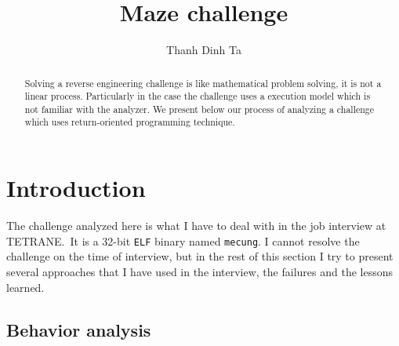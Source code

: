 \documentclass{easychair}
\begin{document}
\title{Maze challenge}

\author{
  Thanh Dinh Ta
}



\clearpage
\maketitle

\begin{abstract}
  Solving a reverse engineering challenge is like mathematical problem solving, it is not a linear process. Particularly in the case the challenge uses a execution model which is not familiar with the analyzer. We present below our process of analyzing a challenge which uses return-oriented programming technique.
\end{abstract}

\section{Introduction}
\label{sec:introduction}

The challenge analyzed here is what I have to deal with in the job interview at TETRANE.~It is a 32-bit \texttt{ELF} binary named \texttt{mecung}. I cannot resolve the challenge on the time of interview, but in the rest of this section I try to present several approaches that I have used in the interview, the failures and the lessons learned.


\subsection{Behavior analysis}
\label{sec:work_around}
\end{document}
